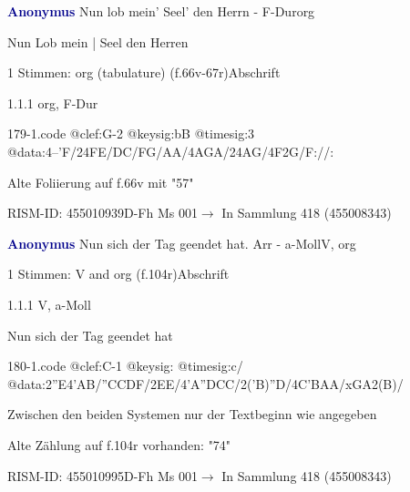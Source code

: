\documentclass[twocolumn]{book}
\begin{document}
\par \vspace{7pt} \textcolor{darkblue}{\textbf{Anonymus  }}\hfillplus{\textbf{[179]}}\newline Nun lob mein' Seel' den Herrn - F-Dur\newline org
\par \begin{itshape}[f.66v, at left:] Nun Lob mein | Seel den Herren\end{itshape} 
\par \textcolor{darkblue}{}  1 Stimmen: org (tabulature)  (f.66v-67r)\newline Abschrift
\par 1.1.1  org, F-Dur  
\begin{filecontents*}{179-1.code}
@clef:G-2
@keysig:bB
@timesig:3
@data:4--'F/24FE/DC/FG/AA/4AGA/24AG/4F2G/F://:
\end{filecontents*}
\newline
%
\par Alte Foliierung auf f.66v mit "57"
\par RISM-ID: 455010939\newline D-Fh  Ms 001\newline $\rightarrow$ In Sammlung 418 (455008343)
      
\par \vspace{7pt} \textcolor{darkblue}{\textbf{Anonymus  }}\hfillplus{\textbf{[180]}}\newline Nun sich der Tag geendet hat. Arr - a-Moll\newline V, org
\par \begin{itshape}\end{itshape} 
\par \textcolor{darkblue}{}  1 Stimmen: V and org  (f.104r)\newline Abschrift
\par 1.1.1  V, a-Moll\newline \begin{footnotesize} Nun sich der Tag geendet hat \end{footnotesize}  
\begin{filecontents*}{180-1.code}
@clef:C-1
@keysig:
@timesig:c/
@data:2''E4'AB/''CCDF/2EE/4'A''DCC/2('B)''D/4C'BAA/xGA2(B)/
\end{filecontents*}
\newline
%
\par Zwischen den beiden Systemen nur der Textbeginn wie angegeben
\par Alte Zählung auf f.104r vorhanden: "74"
\par RISM-ID: 455010995\newline D-Fh  Ms 001\newline $\rightarrow$ In Sammlung 418 (455008343)
      
\end{document}
